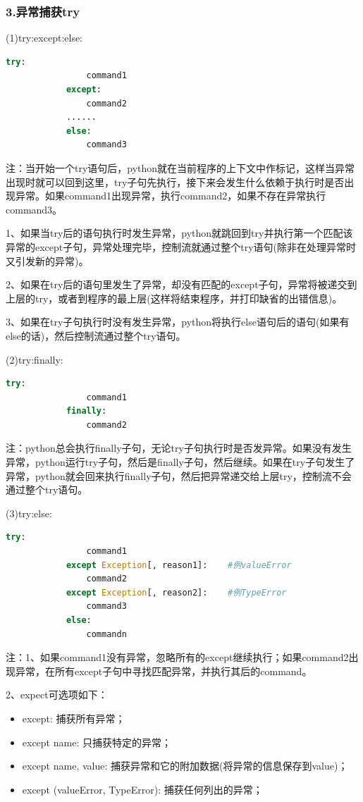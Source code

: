         \subsubsection{3.异常捕获try}
            \par
            (1)try:except:else:
            \begin{lstlisting}[language=Python]
            try:
                command1
            except:
                command2
            ......
            else:
                command3
            \end{lstlisting}
            注：当开始一个try语句后，python就在当前程序的上下文中作标记，这样当异常出现时就可以回到这里，try子句先执行，接下来会发生什么依赖于执行时是否出现异常。如果command1出现异常，执行command2，如果不存在异常执行command3。
            \par
            1、如果当try后的语句执行时发生异常，python就跳回到try并执行第一个匹配该异常的except子句，异常处理完毕，控制流就通过整个try语句(除非在处理异常时又引发新的异常)。\par
            2、如果在try后的语句里发生了异常，却没有匹配的except子句，异常将被递交到上层的try，或者到程序的最上层(这样将结束程序，并打印缺省的出错信息)。\par
            3、如果在try子句执行时没有发生异常，python将执行else语句后的语句(如果有else的话)，然后控制流通过整个try语句。
            \par
            (2)try:finally:
            \begin{lstlisting}[language=Python]
            try:
                command1
            finally:
                command2
            \end{lstlisting}
            注：python总会执行finally子句，无论try子句执行时是否发异常。如果没有发生异常，python运行try子句，然后是finally子句，然后继续。如果在try子句发生了异常，python就会回来执行finally子句，然后把异常递交给上层try，控制流不会通过整个try语句。
            \par
            (3)try:else:
            \begin{lstlisting}[language=Python]
            try:
                command1
            except Exception[, reason1]:    #例valueError
                command2
            except Exception[, reason2]:    #例TypeError
                command3
            else:
                commandn
            \end{lstlisting}
            注：1、如果command1没有异常，忽略所有的except继续执行；如果command2出现异常，在所有except子句中寻找匹配异常，并执行其后的command。\par
            2、expect可选项如下：
            \begin{itemize}
              \item except: 捕获所有异常；
              \item except name: 只捕获特定的异常；
              \item except name, value: 捕获异常和它的附加数据(将异常的信息保存到value)；
              \item except (valueError, TypeError): 捕获任何列出的异常；
            \end{itemize}
